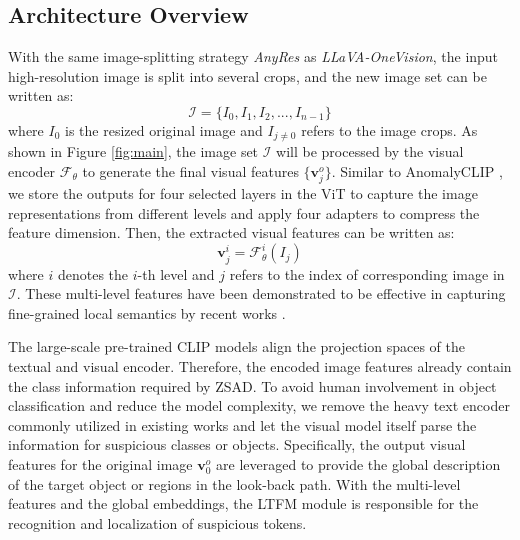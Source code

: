 \subsection{Architecture Overview}
With the same image-splitting strategy \textit{AnyRes} as \textit{LLaVA-OneVision}, the input high-resolution image is split into several crops, and the new image set can be written as:
\begin{equation}
    \mathcal{I}=\{I_{0}, I_{1}, I_{2}, ..., I_{n-1}\}
\end{equation}
where $I_{0}$ is the resized original image and $I_{j\neq 0}$ refers to the image crops. As shown in Figure \ref{fig:main}, the image set $\mathcal{I}$ will be processed by the visual encoder $\mathcal{F}_{\theta}$ to generate the final visual features $\{\mathbf{v}^{o}_{j}\}$. Similar to AnomalyCLIP \cite{zhou2024anomalyclip}, we store the outputs for four selected layers in the ViT \cite{vit} to capture the image representations from different levels and apply four adapters to compress the feature dimension. Then, the extracted visual features can be written as:
\begin{equation}
    \mathbf{v}^{i}_{j} = \mathcal{F}^{i}_{\theta}(I_{j})
\end{equation}
where $i$ denotes the $i$-th level and $j$ refers to the index of corresponding image in $\mathcal{I}$. These multi-level features have been demonstrated to be effective in capturing fine-grained local semantics by recent works \cite{gu2024anomalygpt, cao2025adaclip, zhou2024anomalyclip}.

The large-scale pre-trained CLIP models align the projection spaces of the textual and visual encoder. Therefore, the encoded image features already contain the class information required by ZSAD. To avoid human involvement in object classification and reduce the model complexity, we remove the heavy text encoder commonly utilized in existing works and let the visual model itself parse the information for suspicious classes or objects. Specifically, the output visual features for the original image $\mathbf{v}^{o}_{0}$ are leveraged to provide the global description of the target object or regions in the look-back path. With the multi-level features and the global embeddings, the LTFM module is responsible for the recognition and localization of suspicious tokens.

